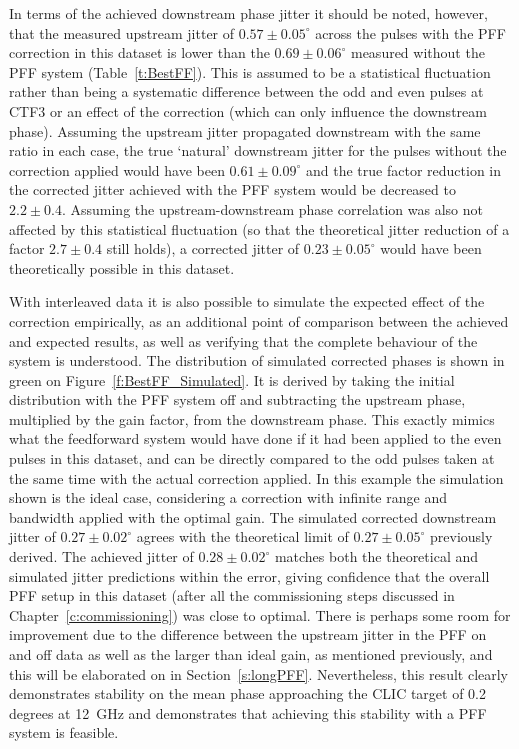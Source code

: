 In terms of the achieved downstream phase jitter it should be noted, however, that the measured upstream jitter of \(0.57\pm0.05^\circ\) across the pulses with the PFF correction in this dataset is lower than the \(0.69\pm0.06^\circ\) measured without the PFF system (Table~\ref{t:BestFF}). This is assumed to be a statistical fluctuation rather than being a systematic difference between the odd and even pulses at CTF3 or an effect of the correction (which can only influence the downstream phase). Assuming the upstream jitter propagated downstream with the same ratio in each case, the true `natural' downstream jitter for the pulses without the correction applied would have been \(0.61\pm0.09^\circ\) and the true factor reduction in the corrected jitter achieved with the PFF system would be decreased to \(2.2\pm0.4\). Assuming the upstream-downstream phase correlation was also not affected by this statistical fluctuation (so that the theoretical jitter reduction of a factor \(2.7\pm0.4\) still holds), a corrected jitter of \(0.23\pm0.05^\circ\) would have been theoretically possible in this dataset.

With interleaved data it is also possible to simulate the expected effect of the correction empirically, as an additional point of comparison between the achieved and expected results, as well as verifying that the complete behaviour of the system is understood. The distribution of simulated corrected phases is shown in green on Figure~\ref{f:BestFF_Simulated}. It is derived by taking the initial distribution with the PFF system off and subtracting the upstream phase, multiplied by the gain factor, from the downstream phase. This exactly mimics what the feedforward system would have done if it had been applied to the even pulses in this dataset, and can be directly compared to the odd pulses taken at the same time with the actual correction applied. In this example the simulation shown is the ideal case, considering a correction with infinite range and bandwidth applied with the optimal gain. The simulated corrected downstream jitter of \(0.27\pm0.02^\circ\) agrees with the theoretical limit of \(0.27\pm0.05^\circ\) previously derived. The achieved jitter of \(0.28\pm0.02^\circ\) matches both the theoretical and simulated jitter predictions within the error, giving confidence that the overall PFF setup in this dataset (after all the commissioning steps discussed in Chapter~\ref{c:commissioning}) was close to optimal. There is perhaps some room for improvement due to the difference between the upstream jitter in the PFF on and off data as well as the larger than ideal gain, as mentioned previously, and this will be elaborated on in Section~\ref{s:longPFF}. Nevertheless, this result clearly demonstrates stability on the mean phase approaching the CLIC target of 0.2 degrees at 12~GHz and demonstrates that achieving this stability with a PFF system is feasible.


